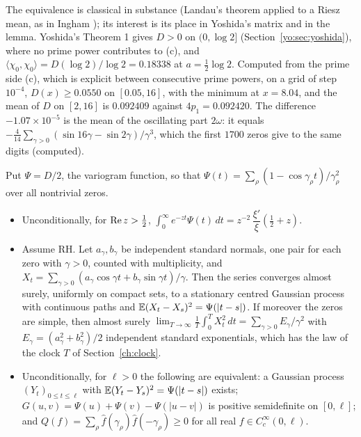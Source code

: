 The equivalence is classical in substance (Landau's theorem applied to a Riesz mean, as in Ingham \cite{Ingham32}); its interest is its place in Yoshida's matrix and in the lemma. Yoshida's Theorem 1 gives $D>0$ on $(0,\log2]$ (Section~\ref{yo:sec:yoshida}), where no prime power contributes to (c), and $\langle\chi_0,\chi_0\rangle=D(\log2)/\log2=0.18338$ at $a=\frac12\log2$. Computed from the prime side (c), which is explicit between consecutive prime powers, on a grid of step $10^{-4}$, $D(x)\ge0.0550$ on $[0.05,16]$, with the minimum at $x=8.04$, and the mean of $D$ on $[2,16]$ is $0.092409$ against $4p_1=0.092420$. The difference $-1.07\times10^{-5}$ is the mean of the oscillating part $2\omega$: it equals $-\frac4{14}\sum_{\gamma>0}(\sin16\gamma-\sin2\gamma)/\gamma^3$, which the first $1700$ zeros give to the same digits (computed).

\begin{proposition}\label{yo:prop:field}
Put $\Psi=D/2$, the variogram function, so that $\Psi(t)=\sum_\rho(1-\cos\gamma_\rho t)/\gamma_\rho^2$ over all nontrivial zeros.
\begin{itemize}
\item[(a)] Unconditionally, for $\operatorname{Re} z>\frac12$, $\int_0^\infty e^{-zt}\Psi(t)\,dt=z^{-2}\,\dfrac{\xi'}\xi(\tfrac12+z)$.
\item[(b)] Assume RH. Let $a_\gamma,b_\gamma$ be independent standard normals, one pair for each zero with $\gamma>0$, counted with multiplicity, and $X_t=\sum_{\gamma>0}(a_\gamma\cos\gamma t+b_\gamma\sin\gamma t)/\gamma$. Then the series converges almost surely, uniformly on compact sets, to a stationary centred Gaussian process with continuous paths and $\mathbb{E}(X_t-X_s)^2=\Psi(|t-s|)$. If moreover the zeros are simple, then almost surely $\lim_{T\to\infty}\frac1T\int_0^TX_t^2\,dt=\sum_{\gamma>0}E_\gamma/\gamma^2$ with $E_\gamma=(a_\gamma^2+b_\gamma^2)/2$ independent standard exponentials, which has the law of the clock $T$ of Section~\ref{ch:clock}.
\item[(c)] Unconditionally, for $\ell>0$ the following are equivalent: a Gaussian process $(Y_t)_{0\le t\le\ell}$ with $\mathbb{E}(Y_t-Y_s)^2=\Psi(|t-s|)$ exists; $G(u,v)=\Psi(u)+\Psi(v)-\Psi(|u-v|)$ is positive semidefinite on $[0,\ell]$; and $Q(f)=\sum_\rho\hat f(\gamma_\rho)\hat f(-\gamma_\rho)\ge0$ for all real $f\in C_c^\infty(0,\ell)$.
\end{itemize}
\end{proposition}

